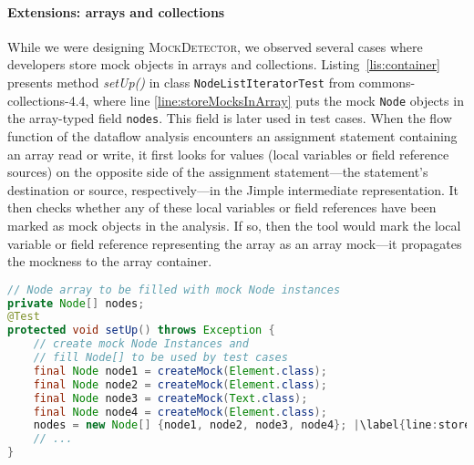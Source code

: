 \paragraph{Extensions: arrays and collections} While we were designing \textsc{MockDetector}, we observed several cases where developers store mock objects in arrays and collections. Listing~\ref{lis:container} presents method \textit{setUp()} in class \texttt{NodeListIteratorTest} from commons-collections-4.4, where line \ref{line:storeMocksInArray} puts the mock \texttt{Node} objects in the array-typed field \texttt{nodes}. This field is later used in test cases. When the flow function of the dataflow analysis encounters an assignment statement containing an array read or write, it first looks for values (local variables or field reference sources) on the opposite side of the assignment statement---the statement's destination or source, respectively---in the Jimple intermediate representation. It then checks whether any of these local variables or field references have been marked as mock objects in the analysis. If so, then the tool would mark the local variable or field reference representing the array as an array mock---it propagates the mockness to the array container.

\begin{lstlisting}[basicstyle=\ttfamily, caption={This example illustrates a field array container holding mock objects from \textit{setup()} in \texttt{NodeListIteratorTest.java}.},
basicstyle=\scriptsize\ttfamily,language = Java, framesep=4.5mm, framexleftmargin=1.0mm, captionpos=b, label=lis:container, escapechar=|, morekeywords={@Test}]
// Node array to be filled with mock Node instances
private Node[] nodes;
@Test
protected void setUp() throws Exception {
    // create mock Node Instances and 
    // fill Node[] to be used by test cases
    final Node node1 = createMock(Element.class);
    final Node node2 = createMock(Element.class);
    final Node node3 = createMock(Text.class);
    final Node node4 = createMock(Element.class);
    nodes = new Node[] {node1, node2, node3, node4}; |\label{line:storeMocksInArray}|
    // ...
}
\end{lstlisting}

